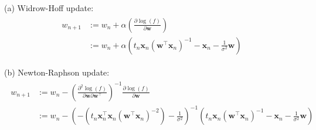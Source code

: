 \documentclass[10pt]{article}
\begin{document}
\begin{itemize}
(a)  Widrow-Hoff update:
\begin{eqnarray*}
\begin{aligned}
w_{n+1} &:= w_n + \alpha (\frac{\partial \log(f)}{\partial \mathbf{w}})
\\
&:= w_n + \alpha (t_n \mathbf{x}_n (\mathbf{w}^\top \mathbf{x}_n)^{-1} 
- \mathbf{x}_n - \frac{1}{\sigma^2}\mathbf{w})
\end{aligned}
\end{eqnarray*}

(b)  Newton-Raphson update:
\begin{eqnarray*}
\begin{aligned}
w_{n+1} &:= w_n - 
\left(
\frac{\partial^2 \log(f)}{\partial \mathbf{w} \partial \mathbf{w}^\top }
\right)^{-1}
\frac{\partial \log(f)}{\partial \mathbf{w}}
\\
&:= w_n - 
\left(
-( t_n \mathbf{x}_n^\top \mathbf{x}_n ( \mathbf{w}^\top \mathbf{x}_n)^{-2}) - \frac{1}{\sigma^2}
\right)^{-1}
\left(
t_n \mathbf{x}_n (\mathbf{w}^\top \mathbf{x}_n)^{-1} - \mathbf{x}_n - \frac{1}{\sigma^2}\mathbf{w}
\right)
\end{aligned}
\end{eqnarray*}

\end{itemize}
\end{document}
